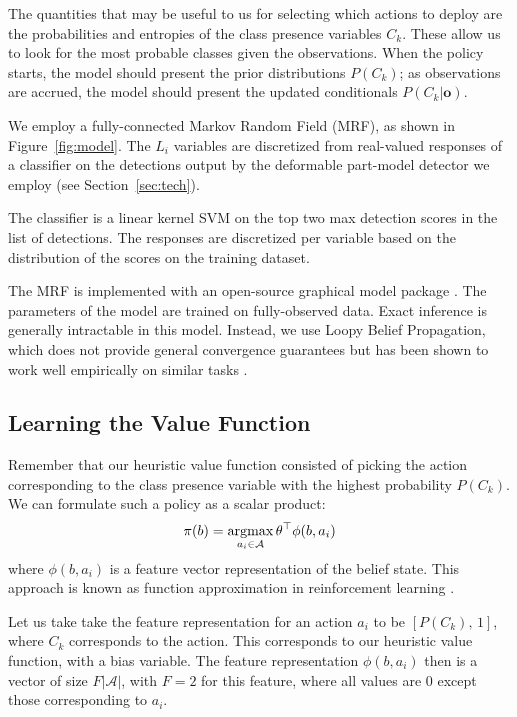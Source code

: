 The quantities that may be useful to us for selecting which actions to deploy are the probabilities and entropies of the class presence variables $C_k$.
These allow us to look for the most probable classes given the observations.
When the policy starts, the model should present the prior distributions $P(C_k)$; as observations are accrued, the model should present the updated conditionals $P(C_k|\mathbf{o})$.

We employ a fully-connected Markov Random Field (MRF), as shown in Figure~\ref{fig:model}.
The $L_i$ variables are discretized from real-valued responses of a classifier on the detections output by the deformable part-model detector we employ (see Section~\ref{sec:tech}).

The classifier is a linear kernel SVM on the top two max detection scores in the list of detections.
The responses are discretized per variable based on the distribution of the scores on the training dataset.

The MRF is implemented with an open-source graphical model package \cite{Jaimovich2010}.
The parameters of the model are trained on fully-observed data.
Exact inference is generally intractable in this model.
Instead, we use Loopy Belief Propagation, which does not provide general convergence guarantees but has been shown to work well empirically on similar tasks .


\subsection{Learning the Value Function}

Remember that our heuristic value function consisted of picking the action corresponding to the class presence variable with the highest probability $P(C_k)$.
We can formulate such a policy as a scalar product:
\begin{align}
\pi(b) = \argmax_{a_i \in \mathcal{A}} \theta^\top \phi(b,a_i)
\end{align}
where $\phi(b,a_i)$ is a feature vector representation of the belief state.
This approach is known as function approximation in reinforcement learning \cite{Sutton1998}.

Let us take take the feature representation for an action $a_i$ to be $[P(C_k), \, 1]$, where $C_k$ corresponds to the action.
This corresponds to our heuristic value function, with a bias variable.
The feature representation $\phi(b,a_i)$ then is a vector of size $F|\mathcal{A}|$, with $F=2$ for this feature, where all values are $0$ except those corresponding to $a_i$.

